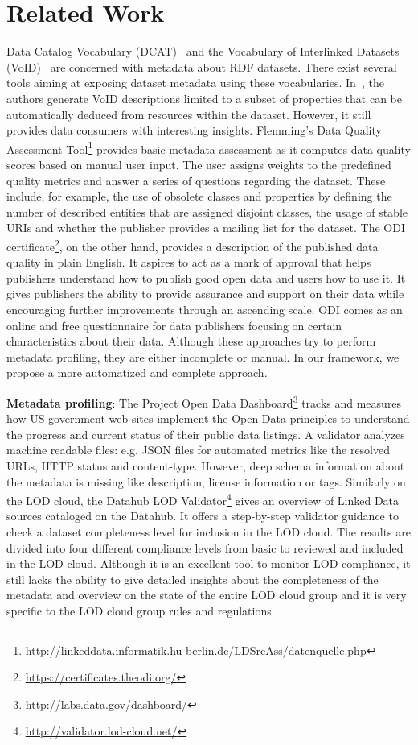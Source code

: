 \documentclass[runningheads,a4paper]{../../Util/LaTEX/llncs}
\begin{document}
\section{Related Work}
\label{sec:related-work}
Data Catalog Vocabulary (DCAT)~\cite{Erickson:DCV:14} and the Vocabulary of Interlinked Datasets (VoID)~\cite{Cyganiak:W3C:11} are concerned with metadata about RDF datasets. There exist several tools aiming at exposing dataset metadata using these vocabularies. In~\cite{Bohm:WebSemJournal:11}, the authors generate VoID descriptions limited to a subset of properties that can be automatically deduced from resources within the dataset. However, it still provides data consumers with interesting insights. Flemming's Data Quality Assessment Tool\footnote{\url{http://linkeddata.informatik.hu-berlin.de/LDSrcAss/datenquelle.php}} provides basic metadata assessment as it computes data quality scores based on manual user input. The user assigns weights to the predefined quality metrics and answer a series of questions regarding the dataset. These include, for example, the use of obsolete classes and properties by defining the number of described entities that are assigned disjoint classes, the usage of stable URIs and whether the publisher provides a mailing list for the dataset. The ODI certificate\footnote{\url{https://certificates.theodi.org/}}, on the other hand, provides a description of the published data quality in plain English. It aspires to act as a mark of approval that helps publishers understand how to publish good open data and users how to use it. It gives publishers the ability to provide assurance and support on their data while encouraging further improvements through an ascending scale. ODI comes as an online and free questionnaire for data publishers focusing on certain characteristics about their data. Although these approaches try to perform metadata profiling, they are either incomplete or manual. In our framework, we propose a more automatized and complete approach.

\textbf{Metadata profiling}: The Project Open Data Dashboard\footnote{\url{http://labs.data.gov/dashboard/}} tracks and measures how US government web sites implement the Open Data principles to understand the progress and current status of their public data listings. A validator analyzes machine readable files: e.g. JSON files for automated metrics like the resolved URLs, HTTP status and content-type. However, deep schema information about the metadata is missing like description, license information or tags. Similarly on the LOD cloud, the Datahub LOD Validator\footnote{\url{http://validator.lod-cloud.net/}} gives an overview of Linked Data sources cataloged on the Datahub. It offers a step-by-step validator guidance to check a dataset completeness level for inclusion in the LOD cloud. The results are divided into four different compliance levels from basic to reviewed and included in the LOD cloud. Although it is an excellent tool to monitor LOD compliance, it still lacks the ability to give detailed insights about the completeness of the metadata and overview on the state of the entire LOD cloud group and it is very specific to the LOD cloud group rules and regulations.
\end{document}
